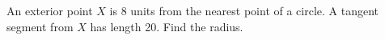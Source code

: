 An exterior point $X$ is 8 units from the nearest point of a circle. A tangent segment from $X$ has length 20. Find the radius.
